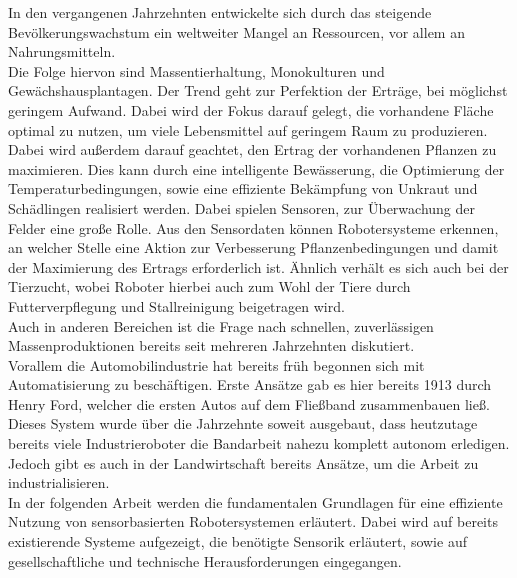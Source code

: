 In den vergangenen Jahrzehnten entwickelte sich durch das steigende
Bevölkerungswachstum ein weltweiter Mangel an Ressourcen, vor allem an
Nahrungsmitteln.\\Die Folge
hiervon sind Massentierhaltung, Monokulturen und Gewächshausplantagen. Der
Trend geht zur Perfektion der Erträge, bei möglichst geringem Aufwand. Dabei
wird der Fokus darauf gelegt, die vorhandene Fläche optimal zu nutzen, um viele
Lebensmittel auf geringem Raum zu produzieren. Dabei wird außerdem darauf
geachtet, den Ertrag der vorhandenen Pflanzen zu maximieren. Dies kann durch
eine intelligente Bewässerung, die Optimierung der Temperaturbedingungen, sowie
eine effiziente Bekämpfung von Unkraut und Schädlingen realisiert werden. Dabei
spielen Sensoren, zur Überwachung der Felder eine große Rolle. Aus den
Sensordaten können Robotersysteme erkennen, an welcher Stelle eine Aktion zur
Verbesserung Pflanzenbedingungen und damit der Maximierung des Ertrags
erforderlich ist. Ähnlich verhält es sich auch bei der Tierzucht, wobei Roboter
hierbei auch zum Wohl der Tiere durch Futterverpflegung und Stallreinigung
beigetragen wird. \\Auch in anderen Bereichen ist die Frage nach schnellen,
zuverlässigen Massenproduktionen bereits seit mehreren Jahrzehnten diskutiert.
\\Vorallem die Automobilindustrie hat bereits früh begonnen sich mit
Automatisierung zu beschäftigen. Erste Ansätze gab es hier bereits 1913 durch
Henry Ford, welcher die ersten Autos auf dem Fließband zusammenbauen ließ.
Dieses System wurde über die Jahrzehnte soweit ausgebaut, dass heutzutage
bereits viele Industrieroboter die Bandarbeit nahezu komplett autonom
erledigen. \\Jedoch gibt es auch in der Landwirtschaft bereits Ansätze, um die
Arbeit zu industrialisieren. \\In der folgenden Arbeit werden die fundamentalen
Grundlagen für eine effiziente Nutzung von sensorbasierten Robotersystemen
erläutert. Dabei wird auf bereits existierende Systeme aufgezeigt, die
benötigte Sensorik erläutert, sowie auf gesellschaftliche und technische
Herausforderungen eingegangen.